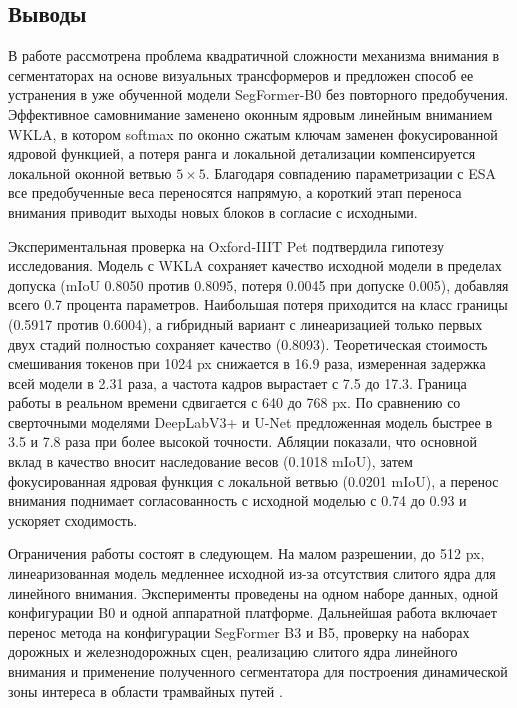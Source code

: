 \documentclass[a4paper,14pt]{article}
\numberwithin{figure}{section}
\numberwithin{table}{section}
\begin{document}
\subsection{Выводы}

	В работе рассмотрена проблема квадратичной сложности механизма внимания в сегментаторах на основе визуальных трансформеров и предложен способ ее
	устранения в уже обученной модели SegFormer-B0 без повторного предобучения. Эффективное самовнимание заменено оконным ядровым линейным вниманием WKLA,
	в котором softmax по оконно сжатым ключам заменен фокусированной ядровой функцией, а потеря ранга и локальной детализации компенсируется локальной
	оконной ветвью $5 \times 5$. Благодаря совпадению параметризации с ESA все предобученные веса переносятся напрямую, а короткий этап переноса внимания
	приводит выходы новых блоков в согласие с исходными.

	Экспериментальная проверка на Oxford-IIIT Pet подтвердила гипотезу исследования. Модель с WKLA сохраняет качество исходной модели в пределах допуска
	(mIoU 0.8050 против 0.8095, потеря 0.0045 при допуске 0.005), добавляя всего 0.7 процента параметров. Наибольшая потеря приходится на класс границы
	(0.5917 против 0.6004), а гибридный вариант с линеаризацией только первых двух стадий полностью сохраняет качество (0.8093). Теоретическая стоимость смешивания токенов
	при 1024 px снижается в 16.9 раза, измеренная задержка всей модели в 2.31 раза, а частота кадров вырастает с 7.5 до 17.3. Граница работы в реальном
	времени сдвигается с 640 до 768 px. По сравнению со сверточными моделями DeepLabV3+ и U-Net предложенная модель быстрее в 3.5 и 7.8 раза при
	более высокой точности. Абляции показали, что основной вклад в качество вносит наследование весов (0.1018 mIoU), затем фокусированная ядровая функция
	с локальной ветвью (0.0201 mIoU), а перенос внимания поднимает согласованность с исходной моделью с 0.74 до 0.93 и ускоряет сходимость.

	Ограничения работы состоят в следующем. На малом разрешении, до 512 px, линеаризованная модель медленнее исходной из-за отсутствия слитого ядра
	для линейного внимания. Эксперименты проведены на одном наборе данных, одной конфигурации B0 и одной аппаратной платформе. Дальнейшая работа
	включает перенос метода на конфигурации SegFormer B3 и B5, проверку на наборах дорожных и железнодорожных сцен, реализацию слитого ядра линейного
	внимания и применение полученного сегментатора для построения динамической зоны интереса в области трамвайных путей \cite{myarticle}.
\end{document}
